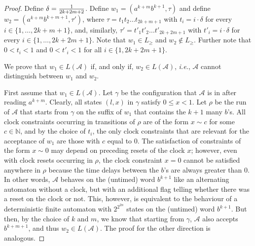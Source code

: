 \documentclass{CSML}
\theoremstyle{plain}\newtheorem{theorem}[thm]{Theorem}
\theoremstyle{plain}\newtheorem{corollary}[thm]{Corollary}
\theoremstyle{plain}\newtheorem{example}[thm]{Example}
\theoremstyle{plain}\newtheorem{lemma}[thm]{Lemma}
\theoremstyle{plain}\newtheorem{remark}[thm]{Remark}
\newcommand{\N}{\mathbb{N}}
\newcommand{\loc}{\mathit{l}}
\newcommand*\ie{\textit{i.e.}}
\newcommand{\A}{\mathcal{A}}
\begin{document}
\begin{proof}
	
	
	
	
	
	



	
	Define $\delta = {1\over {2k+2m+2}}$. 
	Define $w_1 = (a^{k+m} b^{k+1},\tau)$
	and define $w_2 = (a^{k+m} b^{k+m+1},\tau')$, 	
	where $\tau = t_1 t_2 \dots t_{2k+m+1}$ with $t_i=i \cdot \delta$ for every $i\in\{1,\dots, 2k+m+1\}$, 
	and, similarly, $\tau' = t'_1 t'_2 \dots  t'_{2k+2m+1}$ with $t'_{i}=i\cdot\delta$ for every $i\in\{1,\dots, 2k+2m+1\}$.
	Note that $w_1\in L_\geq$ and $w_2\not\in L_\geq$.
	Further note that $0<t_i<1$ and $0<t'_i<1$ for all $i\in\{1,2k+2m+1\}$. 
	
	
	
	We prove that $w_1\in L(\A)$ if, and only if, $w_2\in L(\A)$, \ie, $\A$ cannot distinguish between $w_1$ and $w_2$.
	
	First assume that $w_1\in L(\A)$.	
	Let $\gamma$ be the configuration that $\A$ is in after reading $a^{k+m}$. 
	Clearly, all states $(\loc,x)$ in $\gamma$ satisfy $0\leq x<1$. 
	Let $\rho$ be the run of $\A$  that starts from $\gamma$ on the suffix of $w_1$ that contains the $k+1$ many $b$'s. 
	All clock constraints occurring in transitions of $\rho$ are of the form $x\sim c$ for some $c\in\N$, and by the choice of $t_i$, 
the only  clock constraints that are relevant for the acceptance of $w_1$ are those with $c$ equal to $0$. The satisfaction of constraints of the form $x\sim 0$ may depend on preceding resets of the clock $x$; however, even with clock resets occurring in $\rho$, the clock constraint $x=0$ cannot be satisfied anywhere in $\rho$ because the time delays between the $b$'s are always greater than $0$.
	In other words, $\A$ behaves on the (untimed) word $b^{k+1}$ like an alternating automaton without a clock, but with an additional flag telling whether there was a reset on the clock or not. This, however, is equivalent to the behaviour of a  deterministic finite automaton with $2^{2^{2n}}$ states on the (untimed) word $b^{k+1}$. 
	But then, by the choice of $k$ and $m$, 
	we know that starting from $\gamma$, $\A$ also accepts $b^{k+m+1}$, and thus $w_2\in L(\A)$. 	
	The proof for the other direction is analogous. 
\end{proof}
	
	
	
	
	
	
	
	
			
		
		
\end{document}
